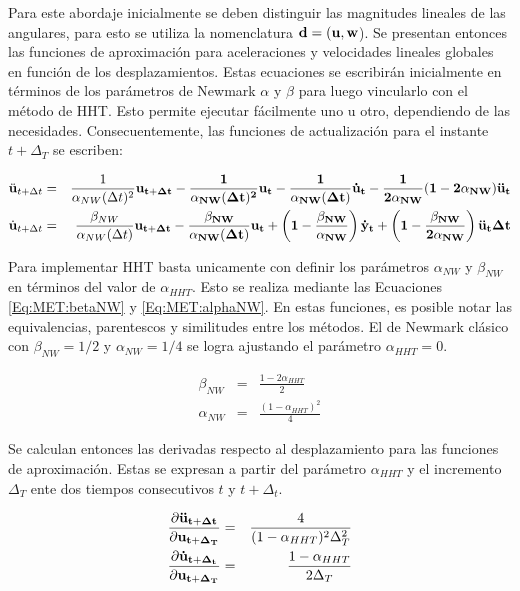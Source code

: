  Para este abordaje inicialmente se deben distinguir las magnitudes lineales de las angulares, para esto se utiliza la nomenclatura $\bf{d}=(\bf{u},\bf{w}$). Se presentan entonces las funciones de aproximación para aceleraciones y velocidades lineales globales en función de los desplazamientos. Estas ecuaciones se escribirán inicialmente en términos de los parámetros de Newmark $\alpha$ y $\beta$ para luego vincularlo con el método de HHT. Esto permite ejecutar fácilmente uno u otro, dependiendo de las necesidades. Consecuentemente, las funciones de actualización para el instante $t+\Delta_T$ se escriben:
 

 \begin{eqnarray}
 \label{Eq:MET:AproxAceleracion}
 \ddot{\bf{u}}_{t+\Delta t}
 &=&
 \frac{1}{\alpha_{NW}(\Delta t)^2} \bf{u}_{t+\Delta t}
 - \frac{1}{\alpha_{NW} (\Delta t)^2} \bf{u}_{t} 
 - \frac{1}{\alpha_{NW} (\Delta t)  } \dot{\bf{u}}_{t} 
 - \frac{1}{2 \alpha_{NW}}  (1-2\alpha_{NW} ) \ddot{\bf{u}}_{t}   \\
 \label{Eq:MET:AproxVelcoity}
 \dot{\bf{u}}_{t+\Delta t}& =&
 \frac{\beta_{NW}}{\alpha_{NW} (\Delta t)} \bf{u}_{t+\Delta t}
 - \frac{\beta_{NW}}{\alpha_{NW} (\Delta t)} \bf{u}_{t}
 + \left( 1 - \frac{\beta_{NW}}{\alpha_{NW}} \right) \dot{\bf{y}}_{t}
 + \left( 1- \frac{\beta_{NW}}{2 \alpha_{NW}} \right) \ddot{\bf{u}}_{t} \Delta t
 \end{eqnarray}  

Para implementar HHT basta unicamente con definir los parámetros $\alpha_{NW}$ y $\beta_{NW}$ en términos del valor de $\alpha_{HHT}$. Esto se realiza mediante las Ecuaciones \eqref{Eq:MET:betaNW} y \eqref{Eq:MET:alphaNW}. En estas funciones, es posible notar las equivalencias, parentescos y similitudes entre los métodos. El de Newmark clásico con $\beta_{NW}=1/2$ y $\alpha_{NW} =1/4$ se logra ajustando el parámetro $\alpha_{HHT}=0$. 

\begin{eqnarray}
	\label{Eq:MET:betaNW}
 	\beta_{NW} &=& \frac{1-2\alpha_{HHT}}{2}\\
 	\label{Eq:MET:alphaNW}
 	\alpha_{NW} &=& \frac{(1-\alpha_{HHT})^2}{4}
\end{eqnarray}

Se calculan entonces las derivadas respecto al desplazamiento para las funciones de aproximación. Estas se expresan a partir del parámetro $\alpha_{HHT}$ y el incremento $\Delta_T$ ente dos tiempos consecutivos $t$ y $t+\Delta_t$.

\begin{eqnarray}
\label{Eq:Met:DerivadasAcelLinear}
\frac{\partial \bf{\ddot{u}_{t+\Delta t}}}{\partial \bf{{u}_{t+\Delta_T}}}& = &
\frac{4}{(1-\alpha_{HHT})^2 \Delta_T^2}\\
\label{Eq:Met:DerivadasVelLinear}
\frac{\partial \bf{\dot{u}_{t+\Delta_t}}}{\partial \bf{{u}_{t+\Delta_T}}}& = &
\frac{1-\alpha_{HHT}}{2\Delta_T}
\end{eqnarray}

